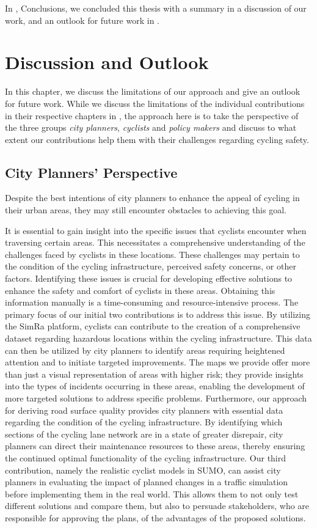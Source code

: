 In , Conclusions, we concluded this thesis with a summary in  a discussion of our work, and an outlook for future work in .
\chapter{Discussion and Outlook}
\label{cha:discussion_and_outlook}
In this chapter, we discuss the limitations of our approach and give an outlook for future work.
While we discuss the limitations of the individual contributions in their respective chapters in ,
the approach here is to take the perspective of the three groups \textit{city planners}, \textit{cyclists} and \textit{policy makers} and discuss to what extent our contributions help them with their challenges regarding cycling safety.

\section*{City Planners' Perspective}
Despite the best intentions of city planners to enhance the appeal of cycling in their urban areas, they may still encounter obstacles to achieving this goal.

It is essential to gain insight into the specific issues that cyclists encounter when traversing certain areas.
This necessitates a comprehensive understanding of the challenges faced by cyclists in these locations.
These challenges may pertain to the condition of the cycling infrastructure, perceived safety concerns, or other factors.
Identifying these issues is crucial for developing effective solutions to enhance the safety and comfort of cyclists in these areas.
Obtaining this information manually is a time-consuming and resource-intensive process.
The primary focus of our initial two contributions is to address this issue.
By utilizing the SimRa platform, cyclists can contribute to the creation of a comprehensive dataset regarding hazardous locations within the cycling infrastructure.
This data can then be utilized by city planners to identify areas requiring heightened attention and to initiate targeted improvements.
The maps we provide offer more than just a visual representation of areas with higher risk; they provide insights into the types of incidents occurring in these areas, enabling the development of more targeted solutions to address specific problems.
Furthermore, our approach for deriving road surface quality provides city planners with essential data regarding the condition of the cycling infrastructure.
By identifying which sections of the cycling lane network are in a state of greater disrepair, city planners can direct their maintenance resources to these areas, thereby ensuring the continued optimal functionality of the cycling infrastructure.
Our third contribution, namely the realistic cyclist models in SUMO, can assist city planners in evaluating the impact of planned changes in a traffic simulation before implementing them in the real world.
This allows them to not only test different solutions and compare them, but also to persuade stakeholders, who are responsible for approving the plans, of the advantages of the proposed solutions.

